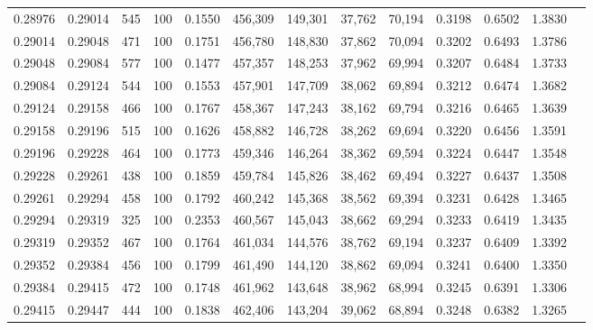 \begin{tabular}{rrrrrrrrrrrrr}
0.28976 & 0.29014 &   545 & 100 &                                     0.1550 & 456,309 & 149,301 &  37,762 &  70,194 & 0.3198 & 0.6502 & 1.3830 \\
0.29014 & 0.29048 &   471 & 100 &                                     0.1751 & 456,780 & 148,830 &  37,862 &  70,094 & 0.3202 & 0.6493 & 1.3786 \\
0.29048 & 0.29084 &   577 & 100 &                                     0.1477 & 457,357 & 148,253 &  37,962 &  69,994 & 0.3207 & 0.6484 & 1.3733 \\
0.29084 & 0.29124 &   544 & 100 &                                     0.1553 & 457,901 & 147,709 &  38,062 &  69,894 & 0.3212 & 0.6474 & 1.3682 \\
0.29124 & 0.29158 &   466 & 100 &                                     0.1767 & 458,367 & 147,243 &  38,162 &  69,794 & 0.3216 & 0.6465 & 1.3639 \\
0.29158 & 0.29196 &   515 & 100 &                                     0.1626 & 458,882 & 146,728 &  38,262 &  69,694 & 0.3220 & 0.6456 & 1.3591 \\
0.29196 & 0.29228 &   464 & 100 &                                     0.1773 & 459,346 & 146,264 &  38,362 &  69,594 & 0.3224 & 0.6447 & 1.3548 \\
0.29228 & 0.29261 &   438 & 100 &                                     0.1859 & 459,784 & 145,826 &  38,462 &  69,494 & 0.3227 & 0.6437 & 1.3508 \\
0.29261 & 0.29294 &   458 & 100 &                                     0.1792 & 460,242 & 145,368 &  38,562 &  69,394 & 0.3231 & 0.6428 & 1.3465 \\
0.29294 & 0.29319 &   325 & 100 &                                     0.2353 & 460,567 & 145,043 &  38,662 &  69,294 & 0.3233 & 0.6419 & 1.3435 \\
0.29319 & 0.29352 &   467 & 100 &                                     0.1764 & 461,034 & 144,576 &  38,762 &  69,194 & 0.3237 & 0.6409 & 1.3392 \\
0.29352 & 0.29384 &   456 & 100 &                                     0.1799 & 461,490 & 144,120 &  38,862 &  69,094 & 0.3241 & 0.6400 & 1.3350 \\
0.29384 & 0.29415 &   472 & 100 &                                     0.1748 & 461,962 & 143,648 &  38,962 &  68,994 & 0.3245 & 0.6391 & 1.3306 \\
0.29415 & 0.29447 &   444 & 100 &                                     0.1838 & 462,406 & 143,204 &  39,062 &  68,894 & 0.3248 & 0.6382 & 1.3265 \\

\end{tabular}
